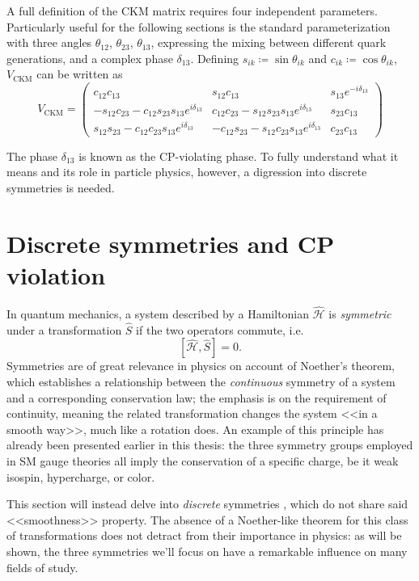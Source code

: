A full definition of the CKM matrix requires four independent parameters.
Particularly useful for the following sections is the standard parameterization with three angles $\theta_{12}$, $\theta_{23}$, $\theta_{13}$, expressing the mixing between different quark generations, and a complex phase $\delta_{13}$.
Defining $s_{ik} \coloneqq \sin\theta_{ik}$ and $c_{ik} \coloneqq \cos\theta_{ik}$, $V_\text{CKM}$ can be written as
\begin{equation}
	V_\text{CKM}
	=
	\begin{pmatrix}
		c_{12} c_{13}
		&
		s_{12} c_{13}
		&
		s_{13} e^{-i\delta_{13}}
		\\
		- s_{12} c_{23} - c_{12} s_{23} s_{13} e^{i\delta_{13}}
		&
		c_{12} c_{23} - s_{12} s_{23} s_{13} e^{i\delta_{13}}
		&
		s_{23} c_{13}
		\\
		s_{12} s_{23} - c_{12} c_{23} s_{13} e^{i\delta_{13}}
		&
		-c_{12} s_{23} - s_{12} c_{23} s_{13} e^{i\delta_{13}}
		&
		c_{23} c_{13}
	\end{pmatrix}	
	\label{eq:CKM-matrix-parameterization}
\end{equation}

The phase $\delta_{13}$ is known as the CP-violating phase. To fully understand what it means and its role in particle physics, however, a digression into discrete symmetries is needed.

\section{Discrete symmetries and CP violation}
\label{sec:discrete}
In quantum mechanics, a system described by a Hamiltonian $\hat{\mathcal{H}}$ is \textit{symmetric} under a transformation $\hat{S}$ if the two operators commute, i.e.
\begin{equation}
\left[ \hat{\mathcal{H}}, \hat{S} \right] = 0.
\end{equation}
Symmetries are of great relevance in physics on account of Noether's theorem, which establishes a relationship between the \textit{continuous} symmetry of a system and a corresponding conservation law;
the emphasis is on the requirement of continuity, meaning the related transformation changes the system <<in a smooth way>>, much like a rotation does.
An example of this principle has already been presented earlier in this thesis:
the three symmetry groups employed in SM gauge theories all imply the conservation of a specific charge, be it weak isospin, hypercharge, or color.

This section will instead delve into \textit{discrete} symmetries \cite{discrete}, which do not share said <<smoothness>> property.
The absence of a Noether-like theorem for this class of transformations does not detract from their importance in physics:
as will be shown, the three symmetries we'll focus on have a remarkable influence on many fields of study.

